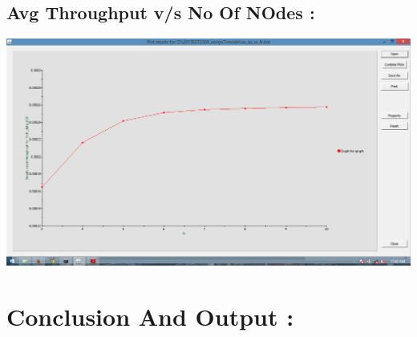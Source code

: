 \documentclass[a4paper,12pt]{article}
\begin{document}
\begin{center}
\subsection {Avg Throughput v/s No Of NOdes :}
 \includegraphics[width=15 cm,height=13 cm]{av_tp_vsN.png}
\end{center}
\newpage
\section{Conclusion And Output :}
\end{document}
